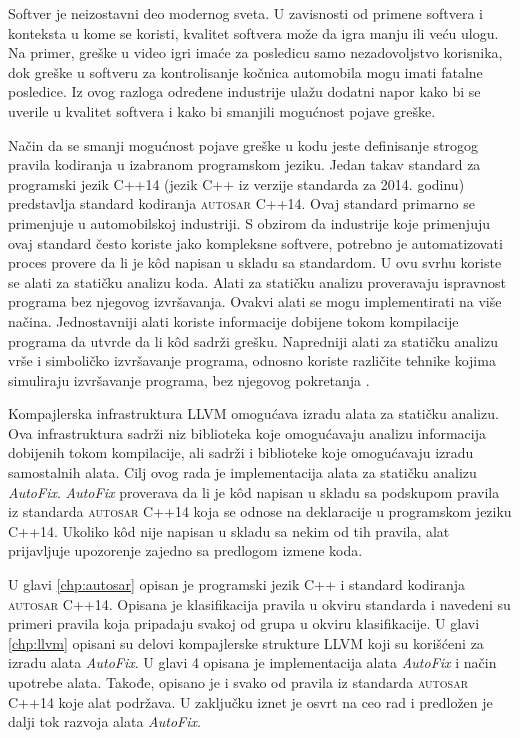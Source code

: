 \documentclass[12pt,oneside]{memoir}
\begin{document}
Softver je neizostavni deo modernog sveta. U zavisnosti od primene softvera i konteksta u kome se koristi, kvalitet softvera mo\v{z}e da igra
manju ili ve\'{c}u ulogu. Na primer, gre\v{s}ke u video igri ima\'{c}e za posledicu samo nezadovoljstvo korisnika, dok gre\v{s}ke u softveru
za kontrolisanje ko\v{c}nica automobila mogu imati fatalne posledice. Iz ovog razloga određene industrije ula\v{z}u dodatni napor kako bi se uverile u kvalitet softvera
i kako bi smanjili mogu\'{c}nost pojave gre\v{s}ke. \par
Na\v{c}in da se smanji mogu\'{c}nost pojave gre\v{s}ke u kodu jeste definisanje strogog pravila kodiranja u izabranom programskom jeziku. Jedan takav standard za programski jezik C++14 (jezik C++ iz verzije standarda za 2014. godinu) predstavlja standard kodiranja \textsc{autosar} C++14. Ovaj standard primarno se primenjuje u automobilskoj industriji. S obzirom da industrije koje primenjuju ovaj standard \v{c}esto koriste jako kompleksne softvere, potrebno je automatizovati proces provere da li je k\^{o}d napisan u skladu sa standardom. U ovu svrhu koriste se alati za stati\v{c}ku analizu koda. Alati za stati\v{c}ku analizu proveravaju ispravnost programa bez njegovog izvr\v{s}avanja. Ovakvi alati se mogu implementirati na vi\v{s}e na\v{c}ina. Jednostavniji alati koriste informacije dobijene tokom kompilacije programa da utvrde da li k\^{o}d sadr\v{z}i gre\v{s}ku. Napredniji alati za stati\v{c}ku analizu vr\v{s}e i simboli\v{c}ko izvr\v{s}avanje programa, odnosno koriste razli\v{c}ite tehnike kojima simuliraju izvr\v{s}avanje programa, bez njegovog pokretanja \cite{Etran, AutoCheck}. \par
Kompajlerska infrastruktura LLVM omogu\'{c}ava izradu alata za stati\v{c}ku analizu. Ova infrastruktura sadr\v{z}i niz biblioteka koje omogu\'{c}avaju analizu informacija dobijenih tokom kompilacije, ali sadr\v{z}i i biblioteke koje omogu\'{c}avaju izradu samostalnih alata. Cilj ovog rada je implementacija alata za stati\v{c}ku analizu
\textit{AutoFix}. \textit{AutoFix} proverava da li je k\^{o}d napisan u skladu sa podskupom pravila iz standarda \textsc{autosar} C++14 koja se odnose na deklaracije u programskom jeziku C++14. Ukoliko k\^{o}d nije napisan u skladu sa nekim od tih pravila, alat prijavljuje upozorenje zajedno sa predlogom izmene koda. 

U glavi \ref{chp:autosar} opisan je programski jezik C++ i standard kodiranja \textsc{autosar} C++14. Opisana je klasifikacija pravila u okviru standarda i navedeni su primeri pravila koja pripadaju svakoj od grupa u okviru klasifikacije. U glavi \ref{chp:llvm} opisani su delovi kompajlerske strukture LLVM koji su kori\v{s}\'{c}eni za izradu alata \textit{AutoFix}. U glavi 4 opisana je implementacija alata \textit{AutoFix} i na\v{c}in upotrebe alata. Takođe, opisano je i svako od pravila iz standarda \textsc{autosar} C++14 koje alat podr\v{z}ava. U zaklju\v{c}ku iznet je osvrt na ceo rad i predlo\v{z}en je dalji tok razvoja alata \textit{AutoFix}.
\end{document}
